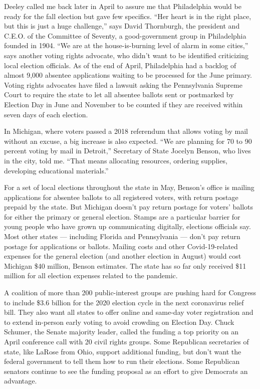 Deeley called me back later in April to assure me that Philadelphia
would be ready for the fall election but gave few specifics. ``Her heart
is in the right place, but this is just a huge challenge,'' says David
Thornburgh, the president and C.E.O. of the Committee of Seventy, a
good-government group in Philadelphia founded in 1904. ``We are at the
house-is-burning level of alarm in some cities,'' says another voting
rights advocate, who didn't want to be identified criticizing local
election officials. As of the end of April, Philadelphia had a backlog
of almost 9,000 absentee applications waiting to be processed for the
June primary. Voting rights advocates have filed a lawsuit asking the
Pennsylvania Supreme Court to require the state to let all absentee
ballots sent or postmarked by Election Day in June and November to be
counted if they are received within seven days of each election.

In Michigan, where voters passed a 2018 referendum that allows voting by
mail without an excuse, a big increase is also expected. ``We are
planning for 70 to 90 percent voting by mail in Detroit,'' Secretary of
State Jocelyn Benson, who lives in the city, told me. ``That means
allocating resources, ordering supplies, developing educational
materials.''

For a set of local elections throughout the state in May, Benson's
office is mailing applications for absentee ballots to all registered
voters, with return postage prepaid by the state. But Michigan doesn't
pay return postage for voters' ballots for either the primary or general
election. Stamps are a particular barrier for young people who have
grown up communicating digitally, elections officials say. Most other
states --- including Florida and Pennsylvania --- don't pay return
postage for applications or ballots. Mailing costs and other
Covid-19-related expenses for the general election (and another election
in August) would cost Michigan \$40 million, Benson estimates. The state
has so far only received \$11 million for all election expenses related
to the pandemic.

A coalition of more than 200 public-interest groups are pushing hard for
Congress to include \$3.6 billion for the 2020 election cycle in the
next coronavirus relief bill. They also want all states to offer online
and same-day voter registration and to extend in-person early voting to
avoid crowding on Election Day. Chuck Schumer, the Senate majority
leader, called the funding a top priority on an April conference call
with 20 civil rights groups. Some Republican secretaries of state, like
LaRose from Ohio, support additional funding, but don't want the federal
government to tell them how to run their elections. Some Republican
senators continue to see the funding proposal as an effort to give
Democrats an advantage.

